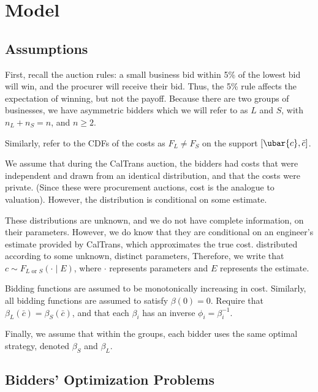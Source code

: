 \section{Model}

\setlength{\parindent}{0cm}

\subsection{Assumptions}

First, recall the auction rules: a small business bid
within 5\% of the lowest bid will win, and the procurer will receive their
bid. Thus, the 5\% rule affects the expectation of winning, but not the payoff.
Because there are two groups of businesses, we have asymmetric bidders which
we will refer to as \(L\) and \(S\), with \(n_L + n_S = n\), and \(n \ge 2\).

Similarly, refer to the CDFs of the costs as \(F_{L} \ne F_{S}\)
on the support  \([\ubar{c}, \bar{c}]\).

We assume that during the CalTrans auction, the bidders had costs that
were independent and drawn from an identical distribution, and that the costs
were private. (Since these were procurement auctions, cost is the analogue to
valuation). However, the distribution is conditional on some estimate.

These distributions are unknown, and we do not have complete information, on
their parameters. However, we do know that they are conditional on an engineer's
estimate provided by CalTrans, which approximates the true cost.
distributed according to some unknown, distinct parameters,
Therefore, we write that \(c \sim F_{L \text{ or } S}(\cdot \mid E)\),
where \(\cdot\) represents parameters and \(E\) represents the estimate.
 
Bidding functions are assumed to be monotonically increasing in cost.
Similarly, all bidding functions are assumed to satisfy \(\beta(0) = 0\).
Require that \(\beta_L(\bar{c}) = \beta_S(\bar{c})\), and that
each \(\beta_{i}\) has an inverse \(\phi_{i} = \beta_{i}^{-1}\).

Finally, we assume that within the groups, each bidder uses the same optimal
strategy, denoted \(\beta_S\) and \(\beta_L\).


\subsection{Bidders' Optimization Problems}

